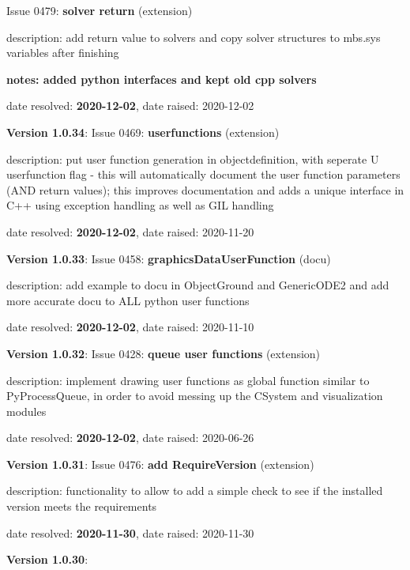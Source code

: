   Issue 0479: {\bf solver return}
(extension)
  \bi
  \item {\small description: add return value to solvers and copy solver structures to mbs.sys variables after finishing}
  \item {\small \bf notes: added python interfaces and kept old cpp solvers}
  \item   date resolved: {\bf 2020-12-02},
date raised: 2020-12-02   \ei
  \item {\bf Version 1.0.34}: \vspace{-6pt} 
  Issue 0469: {\bf userfunctions}
(extension)
  \bi
  \item {\small description: put user function generation in objectdefinition, with seperate U userfunction flag - this will automatically document the user function parameters (AND return values); this improves documentation and adds a unique interface in C++ using exception handling as well as GIL handling}
  \item   date resolved: {\bf 2020-12-02},
date raised: 2020-11-20   \ei
  \item {\bf Version 1.0.33}: \vspace{-6pt} 
  Issue 0458: {\bf graphicsDataUserFunction}
(docu)
  \bi
  \item {\small description: add example to docu in ObjectGround and GenericODE2 and add more accurate docu to ALL python user functions}
  \item   date resolved: {\bf 2020-12-02},
date raised: 2020-11-10   \ei
  \item {\bf Version 1.0.32}: \vspace{-6pt} 
  Issue 0428: {\bf queue user functions}
(extension)
  \bi
  \item {\small description: implement drawing user functions as global function similar to PyProcessQueue, in order to avoid messing up the CSystem and visualization modules}
  \item   date resolved: {\bf 2020-12-02},
date raised: 2020-06-26   \ei
  \item {\bf Version 1.0.31}: \vspace{-6pt} 
  Issue 0476: {\bf add RequireVersion}
(extension)
  \bi
  \item {\small description: functionality to allow to add a simple check to see if the installed version meets the requirements}
  \item   date resolved: {\bf 2020-11-30},
date raised: 2020-11-30   \ei
  \item {\bf Version 1.0.30}: \vspace{-6pt} 
